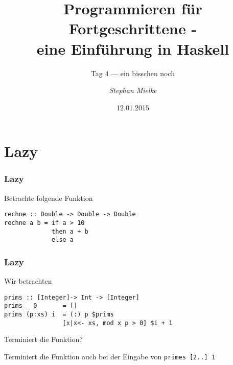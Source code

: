 \documentclass[fleqn,11pt,aspectratio=43]{beamer}
\title{Programmieren für Fortgeschrittene - \\eine Einführung in Haskell}
\author[Stephan Mielke]{\emph{Stephan Mielke}}
\institute[TU Braunschweig, IPS]{Technische Universität Braunschweig, IPS}
\begin{document}
\subtitle{Tag 4 --- ein bisschen noch} 
\date{12.01.2015}

\begin{frame}[plain]
\titlepage
\end{frame}

\section{Lazy}
\begin{frame}[fragile]
\frametitle{Lazy}
\begin{block}{Betrachte folgende Funktion}
\begin{lstlisting}
rechne :: Double -> Double -> Double
rechne a b = if a > 10 
             then a + b
             else a
\end{lstlisting}
\end{block}
\end{frame}


\begin{frame}[fragile]
\frametitle{Lazy}
\begin{block}{Wir betrachten}
\begin{lstlisting}
prims :: [Integer]-> Int -> [Integer]
prims _ 0 		= []
prims (p:xs) i 	= (:) p $prims 
                [x|x<- xs, mod x p > 0] $i + 1
\end{lstlisting}
Terminiert die Funktion?
\end{block}
\pause 
\begin{block}{Terminiert die Funktion auch bei der Eingabe von}
\lstinline|primes [2..] 1|
\end{block}
\end{frame}

\end{document}
